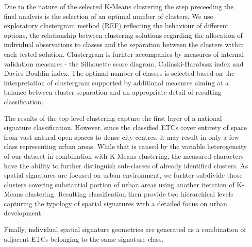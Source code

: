 Due to the nature of the selected K-Means clustering the step preceeding the final
analysis is the selection of an optimal number of clusters. We use exploratory
clustergram method (REF) reflecting the behaviour of different options, the relationship
between clustering solutions regarding the allocation of individual observations to
classes and the separation between the clusters within each tested solution.
Clustergram is furhter accompanies by measures of internal validation measures - the
Silhouette score diagram, Calinski-Harabasz index and Davies-Bouldin index. The optimal
number of classes is selected based on the interpretation of clustergram supported by
additional measures aiming at a balance between cluster separation and an appropriate
detail of resulting classification.

The results of the top level clustering capture the first layer of a national signature
classification. However, since the classified ETCs cover entirety of space from vast
natural open spaces to dense city centres, it may result in only a few class
representing urban areas. While that is caused by the variable heterogeneity of our
dataset in combination with K-Means clustering, the measured characters have the ability
to further distinguish sub-classes of already identified clusters. As spatial signatures
are focused on urban environment, we furhter subdivide those clusters covering
substantial portion of urban areas using another iteration of K-Means clustering.
Resulting classification then provide two hierarchical levels capturing the typology of
spatial signatures with a detailed focus on urban development.


Finally, individual spatial signature geometries are generated as a combination of
adjacent ETCs belonging to the same signature class.

